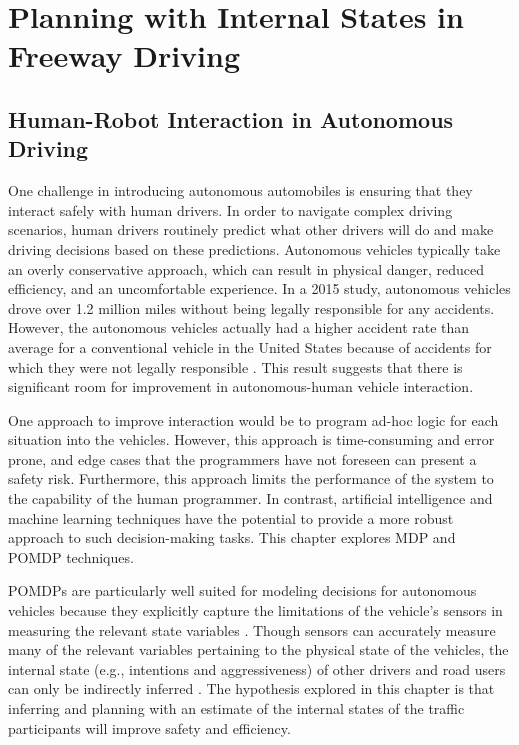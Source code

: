 \chapter{Planning with Internal States in Freeway Driving}

\section{Human-Robot Interaction in Autonomous Driving}

One challenge in introducing autonomous automobiles is ensuring that they interact safely with human drivers.
In order to navigate complex driving scenarios, human drivers routinely predict what other drivers will do and make driving decisions based on these predictions.
Autonomous vehicles typically take an overly conservative approach, which can result in physical danger, reduced efficiency, and an uncomfortable experience. %
In a 2015 study, autonomous vehicles drove over 1.2 million miles without being legally responsible for any accidents.
However, the autonomous vehicles actually had a higher accident rate than average for a conventional vehicle in the United States because of accidents for which they were not legally responsible \cite{schoettle2015crashes}.
This result suggests that there is significant room for improvement in autonomous-human vehicle interaction.  

One approach to improve interaction would be to program ad-hoc logic for each situation into the vehicles.
However, this approach is time-consuming and error prone, and edge cases that the programmers have not foreseen can present a safety risk.
Furthermore, this approach limits the performance of the system to the capability of the human programmer.
In contrast, artificial intelligence and machine learning techniques have the potential to provide a more robust approach to such decision-making tasks.
This chapter explores MDP and POMDP techniques.

POMDPs are particularly well suited for modeling decisions for autonomous vehicles because they explicitly capture the limitations of the vehicle's sensors in measuring the relevant state variables \cite{brechtel2013mcvi, sadigh2016gathering, bai2015intention}.
Though sensors can accurately measure many of the relevant variables pertaining to the physical state of the vehicles, the internal state (e.g., intentions and aggressiveness) of other drivers and road users can only be indirectly inferred \cite{sadigh2016gathering, bai2015intention, lam2015, dc2015}.
The hypothesis explored in this chapter is that inferring and planning with an estimate of the internal states of the traffic participants will improve safety and efficiency.

